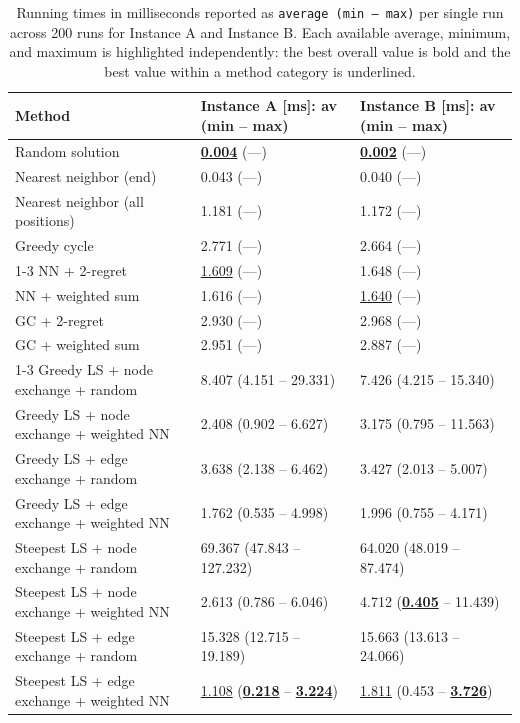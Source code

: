 \begin{table}[h!]
\centering
\footnotesize
\setlength{\tabcolsep}{3pt}
\renewcommand{\arraystretch}{1.5}
\caption{Running times in milliseconds reported as \texttt{average (min -- max)} per single run across 200 runs for Instance A and Instance B. Each available average, minimum, and maximum is highlighted independently: the best overall value is bold and the best value within a method category is underlined.}
\label{tab:time_results}
\vspace{0.5em}
\begin{tabularx}{\textwidth}{p{7.2cm} X X}
\toprule
\textbf{Method} & \textbf{Instance A [ms]: av (min -- max)} & \textbf{Instance B [ms]: av (min -- max)} \\
\midrule
Random solution & \textbf{\underline{0.004}} (---) & \textbf{\underline{0.002}} (---) \\
Nearest neighbor (end) & 0.043 (---) & 0.040 (---) \\
Nearest neighbor (all positions) & 1.181 (---) & 1.172 (---) \\
Greedy cycle & 2.771 (---) & 2.664 (---) \\
\cmidrule{1-3}
NN + 2-regret & \underline{1.609} (---) & 1.648 (---) \\
NN + weighted sum & 1.616 (---) & \underline{1.640} (---) \\
GC + 2-regret & 2.930 (---) & 2.968 (---) \\
GC + weighted sum & 2.951 (---) & 2.887 (---) \\
\cmidrule{1-3}
Greedy LS + node exchange + random & 8.407 (4.151 -- 29.331) & 7.426 (4.215 -- 15.340) \\
Greedy LS + node exchange + weighted NN & 2.408 (0.902 -- 6.627) & 3.175 (0.795 -- 11.563) \\
Greedy LS + edge exchange + random & 3.638 (2.138 -- 6.462) & 3.427 (2.013 -- 5.007) \\
Greedy LS + edge exchange + weighted NN & 1.762 (0.535 -- 4.998) & 1.996 (0.755 -- 4.171) \\
Steepest LS + node exchange + random & 69.367 (47.843 -- 127.232) & 64.020 (48.019 -- 87.474) \\
Steepest LS + node exchange + weighted NN & 2.613 (0.786 -- 6.046) & 4.712 (\textbf{\underline{0.405}} -- 11.439) \\
Steepest LS + edge exchange + random & 15.328 (12.715 -- 19.189) & 15.663 (13.613 -- 24.066) \\
Steepest LS + edge exchange + weighted NN & \underline{1.108} (\textbf{\underline{0.218}} -- \textbf{\underline{3.224}}) & \underline{1.811} (0.453 -- \textbf{\underline{3.726}}) \\
\bottomrule
\end{tabularx}
\end{table}

